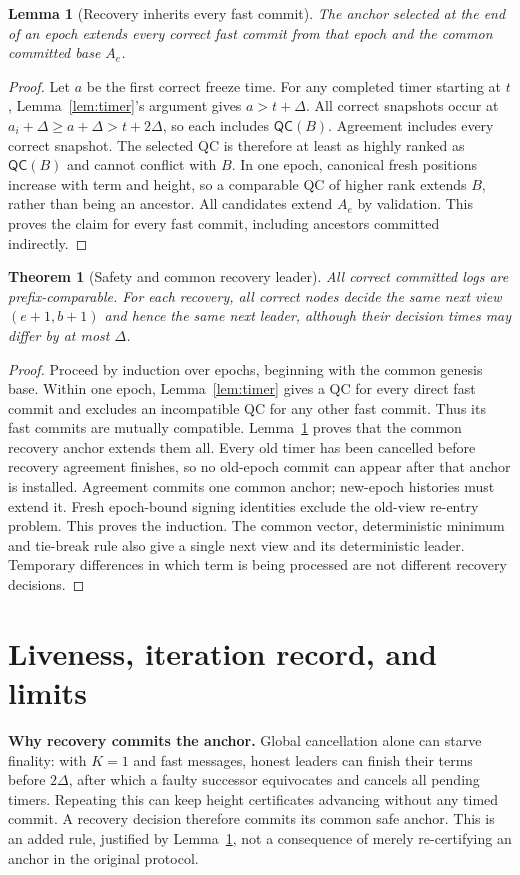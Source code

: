 \documentclass[10pt,a4paper]{article}
\newcommand{\QC}{\mathsf{QC}}
\newtheorem{lemma}{Lemma}
\newtheorem{theorem}{Theorem}
\begin{document}
\begin{lemma}[Recovery inherits every fast commit]\label{lem:inherit}
The anchor selected at the end of an epoch extends every correct fast
commit from that epoch and the common committed base $A_e$.
\end{lemma}
\begin{proof}
Let $a$ be the first correct freeze time. For any completed timer starting
at $t$, Lemma~\ref{lem:timer}'s argument gives $a>t+\Delta$. All correct
snapshots occur at $a_i+\Delta\ge a+\Delta>t+2\Delta$, so each includes
$\QC(B)$. Agreement includes every correct snapshot. The selected QC is
therefore at least as highly ranked as $\QC(B)$ and cannot conflict with
$B$. In one epoch, canonical fresh positions increase with term and height,
so a comparable QC of higher rank extends $B$, rather than being an ancestor.
All candidates extend $A_e$ by validation. This proves the claim for every
fast commit, including ancestors committed indirectly.
\end{proof}

\begin{theorem}[Safety and common recovery leader]
All correct committed logs are prefix-comparable. For each recovery,
all correct nodes decide the same next view $(e+1,b+1)$ and hence the same
next leader, although their decision times may differ by at most $\Delta$.
\end{theorem}
\begin{proof}
Proceed by induction over epochs, beginning with the common genesis base.
Within one epoch, Lemma~\ref{lem:timer} gives a QC for every direct fast
commit and excludes an incompatible QC for any other fast commit. Thus its
fast commits are mutually compatible. Lemma~\ref{lem:inherit} proves that
the common recovery anchor extends them all. Every old timer has been
cancelled before recovery agreement finishes, so no old-epoch commit can
appear after that anchor is installed. Agreement commits one common anchor;
new-epoch histories must extend it. Fresh epoch-bound signing identities
exclude the old-view re-entry problem. This proves the induction.
The common vector, deterministic minimum and tie-break rule also give a
single next view and its deterministic leader. Temporary differences in
which term is being processed are not different recovery decisions.
\end{proof}

\clearpage
\section*{Liveness, iteration record, and limits}
\textbf{Why recovery commits the anchor.} Global cancellation alone can
starve finality: with $K=1$ and fast messages, honest leaders can finish their
terms before $2\Delta$, after which a faulty successor equivocates and cancels
all pending timers. Repeating this can keep height certificates advancing
without any timed commit. A recovery decision therefore commits its common
safe anchor. This is an added rule, justified by Lemma~\ref{lem:inherit}, not
a consequence of merely re-certifying an anchor in the original protocol.
\end{document}
